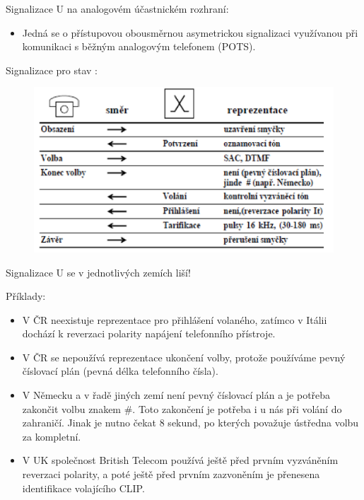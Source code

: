 Signalizace U na analogovém účastnickém rozhraní:
\begin{itemize}[noitemsep]
    \item Jedná se o přístupovou obousměrnou asymetrickou signalizaci využívanou při komunikaci s běžným analogovým telefonem (POTS).
\end{itemize}

\noindent Signalizace pro stav :
\begin{figure}[h!]
    \begin{center}
        \includegraphics[width=\textwidth]{images/otazka16.png}
        \label{img:7}
    \end{center}
\end{figure}

\noindent Signalizace U se v jednotlivých zemích liší!

\noindent Příklady:
\begin{itemize}[noitemsep]
    \item V ČR neexistuje reprezentace pro přihlášení volaného, zatímco v Itálii dochází k reverzaci polarity napájení telefonního přístroje.
    \item V ČR se nepoužívá reprezentace ukončení volby, protože používáme pevný číslovací plán (pevná délka telefonního čísla).
    \item V Německu a v řadě jiných zemí není pevný číslovací plán a je potřeba zakončit volbu znakem \#. Toto zakončení je potřeba i u nás při volání do zahraničí. Jinak je nutno čekat 8 sekund, po kterých považuje ústředna volbu za kompletní.
    \item V UK společnost British Telecom používá ještě před prvním vyzváněním reverzaci polarity, a poté ještě před prvním zazvoněním je přenesena identifikace volajícího CLIP.
\end{itemize}

